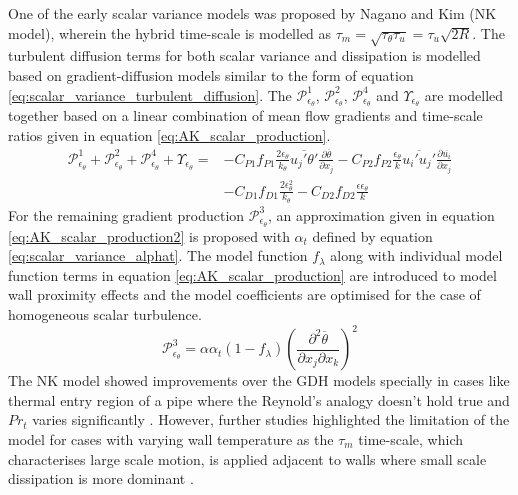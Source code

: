 One of the early scalar variance models was proposed by Nagano and Kim \cite{Nagano1988} (NK model), wherein the hybrid time-scale is modelled as $\tau_{m} = \sqrt{\tau_{\theta}\tau_{u}} = \tau_{u}\sqrt{2R}$. The turbulent diffusion terms for both scalar variance and dissipation is modelled based on gradient-diffusion models similar to the form of equation \ref{eq:scalar_variance_turbulent_diffusion}. The $\mathcal{P}_{\epsilon_{\theta}}^{1}$, $\mathcal{P}_{\epsilon_{\theta}}^{2}$, $\mathcal{P}_{\epsilon_{\theta}}^{4}$ and $\Upsilon_{\epsilon_{\theta}}$ are modelled together based on a linear combination of mean flow gradients and time-scale ratios given in equation \ref{eq:AK_scalar_production}. 
\begin{equation}
\label{eq:AK_scalar_production}
\begin{aligned}
\mathcal{P}_{\epsilon_{\theta}}^{1} + \mathcal{P}_{\epsilon_{\theta}}^{2} + \mathcal{P}_{\epsilon_{\theta}}^{4} + \Upsilon_{\epsilon_{\theta}} = {} & -C_{P1}f_{P1}\frac{2\epsilon_{\theta}}{k_{\theta}}\overline{u_{j}'\theta'}\frac{\partial \overline{\theta}}{\partial x_{j}} - C_{P2}f_{P2}\frac{\epsilon_{\theta}}{k}\overline{u_{i}'u_{j}'}\frac{\partial \overline{u_{i}}}{\partial x_{j}} \\
&- C_{D1}f_{D1}\frac{2\epsilon_{\theta}^{2}}{k_{\theta}} - C_{D2}f_{D2}\frac{\epsilon \epsilon_{\theta}}{k}
\end{aligned}
\end{equation}
For the remaining gradient production $\mathcal{P}_{\epsilon_{\theta}}^{3}$, an approximation given in equation \ref{eq:AK_scalar_production2} is proposed with $\alpha_{t}$ defined by equation \ref{eq:scalar_variance_alphat}. The model function $f_{\lambda}$ along with individual model function terms in equation \ref{eq:AK_scalar_production} are introduced to model wall proximity effects and the model coefficients are optimised for the case of homogeneous scalar turbulence.  
\begin{equation}
\label{eq:AK_scalar_production2}
\mathcal{P}_{\epsilon_{\theta}}^{3} = \alpha\alpha_{t}\left(1-f_{\lambda}\right)\left(\frac{\partial^{2} \overline{\theta}}{\partial x_{j} \partial x_{k}}\right)^{2}
\end{equation}
The NK model showed improvements over the GDH models specially in cases like thermal entry region of a pipe where the Reynold's analogy doesn't hold true and $Pr_{t}$ varies significantly \cite{Nagano1988}. However, further studies highlighted the limitation of the model for cases with varying wall temperature \cite{Yoder2016} as the $\tau_{m}$ time-scale, which characterises large scale motion, is applied adjacent to walls where small scale dissipation is more dominant \cite{Nagano1996}. 

